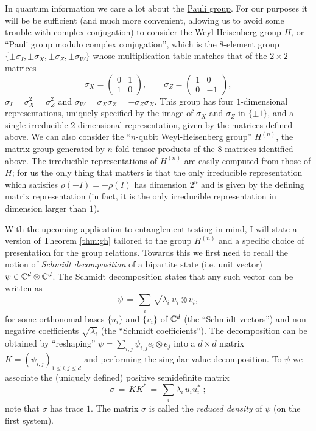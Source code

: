In quantum information we care a lot about the \href{https://en.wikipedia.org/wiki/Pauli_group}{Pauli group}. For our purposes it will be be sufficient (and much more convenient, allowing us to avoid some trouble with complex conjugation) to consider the Weyl-Heisenberg group $H$, or ``Pauli group modulo complex conjugation'', which is the $8$-element group $\{\pm \sigma_I,\pm \sigma_X,\pm \sigma_Z,\pm \sigma_W\}$ whose multiplication table matches that of the $2\times 2$ matrices 
\begin{equation}\label{eq:def-pauli}
 \sigma_X = \begin{pmatrix} 0 & 1 \\ 1 & 0 \end{pmatrix},\qquad \sigma_Z= \begin{pmatrix} 1 & 0 \\ 0 & -1 \end{pmatrix}, 
\end{equation}
$\sigma_I = \sigma_X^2 = \sigma_Z^2$ and $\sigma_W=\sigma_X\sigma_Z=-\sigma_Z\sigma_X$. This group has four $1$-dimensional representations, uniquely specified by the image of $\sigma_X$ and $\sigma_Z$ in $\{\pm 1\}$, and a single irreducible $2$-dimensional representation, given by the matrices defined above. We can also consider the ``$n$-qubit Weyl-Heisenberg group'' $H^{(n)}$, the matrix group generated by $n$-fold tensor products of the $8$ matrices identified above. The irreducible representations of  $H^{(n)}$ are easily computed from those of $H$; for us the only thing that matters is that the only irreducible representation which satisfies $\rho(-I)=-\rho(I)$ has dimension $2^n$ and is given by the defining matrix representation (in fact, it is the only irreducible representation in dimension larger than $1$).

With the upcoming application to entanglement testing in mind, 
I will state a version of Theorem \ref{thm:gh} tailored to the group $H^{(n)}$ and a specific choice of presentation for the group relations. Towards this we first need to recall the notion of \emph{Schmidt decomposition} of a bipartite state (i.e. unit vector) $\psi \in \mathbb{C}^d \otimes \mathbb{C}^d$. The Schmidt decomposition states that any such vector can be written as 
\begin{equation}\label{eq:schmidt}
\psi \,=\, \sum_i \,\sqrt{\lambda_i}\, u_i \otimes v_i,
\end{equation}
 for some orthonomal bases $\{u_i\}$ and $\{v_i\}$ of $\mathbb{C}^d$ (the ``Schmidt vectors'') and non-negative coefficients $\sqrt{\lambda_i}$ (the ``Schmidt coefficients''). The decomposition can be obtained by ``reshaping'' $\psi = \sum_{i,j}  \psi_{i,j} e_i \otimes e_j$ into a $d\times d$ matrix $K=(\psi_{i,j})_{1\leq i,j\leq d}$ and performing the singular value decomposition. To $\psi$ we associate the (uniquely defined) positive semidefinite matrix
\begin{equation}\label{eq:sigma}
\sigma \,=\, KK^* \,=\, \sum_i \lambda_i\,u_iu_i^*\; ;
\end{equation} note that $\sigma$ has trace $1$. The matrix $\sigma$ is called the \emph{reduced density} of $\psi$ (on the first system). 

